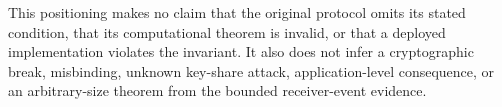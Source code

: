 This positioning makes no claim that the original protocol omits its stated
condition, that its computational theorem is invalid, or that a deployed
implementation violates the invariant. It also does not infer a cryptographic
break, misbinding, unknown key-share attack, application-level consequence, or
an arbitrary-size theorem from the bounded receiver-event evidence.

